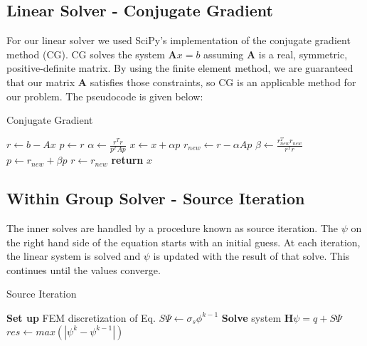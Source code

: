 \subsection{Linear Solver - Conjugate Gradient}
For our linear solver we used SciPy's implementation of the conjugate gradient method (CG). CG solves the system $\textbf{A}x = b$ assuming $\textbf{A}$ is a real, symmetric, positive-definite matrix. By using the finite element method, we are guaranteed that our matrix $\textbf{A}$ satisfies those constraints, so CG is an applicable method for our problem.  The pseudocode is given below:
\begin{algorithm}
\caption{Conjugate Gradient}
\begin{algorithmic}
    \State $r \gets b - Ax$
    \State $p \gets r$
        \State $\alpha \gets \frac{r^Tr}{p^TAp}$
        \State $x \gets x + \alpha p$
        \State $r_{new} \gets r - \alpha A p$
        \State $\beta \gets \frac{r_{new}^Tr_{new}}{r^Tr}$
        \State $p \gets r_{new} + \beta p$
        \State $r \gets r_{new}$
    \EndWhile
    \State \textbf{return} $x$  
\end{algorithmic}
\end{algorithm}

\subsection{Within Group Solver - Source Iteration}
The inner solves are handled by a procedure known as source iteration. The $\psi$ on the right hand side of the equation starts with an initial guess. At each iteration, the linear system is solved and $\psi$ is updated with the result of that solve. This continues until the values converge. 
\begin{algorithm}
\caption{Source Iteration}
\begin{algorithmic}
 
    \State \textbf{Set up} FEM discretization of Eq.
    \State $S\Psi \gets \sigma_s \phi^{k-1}$ 
    \State \textbf{Solve} system $\textbf{H}\psi=q + S\Psi$
    \State $res \gets max(|\psi^{k} - \psi^{k-1}|)$
\EndWhile
\end{algorithmic}
\end{algorithm}

